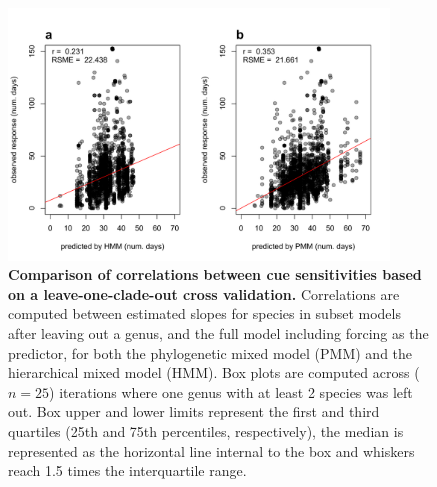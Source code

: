 \documentclass{article}
\begin{document}
\begin{figure}
  \centering
\noindent \includegraphics[width=0.9\textwidth]{../../analyses/phylogeny/figures/FigSXXX_LOCO_observed_vs_predicted}
  \caption{\textbf{Comparison of correlations between cue sensitivities based on a leave-one-clade-out cross validation.} Correlations are computed between estimated slopes for species in subset models after leaving out a genus, and the full model including forcing as the predictor, for both the phylogenetic mixed model (PMM) and the hierarchical mixed model (HMM). Box plots are computed across ($n = 25$) iterations where one genus with at least 2 species was left out. Box upper and lower limits represent the first and third quartiles (25th and 75th percentiles, respectively), the median is represented as the horizontal line internal to the box and whiskers reach 1.5 times the interquartile range.}
  \label{fig:LOCO_obsvspred} 
\end{figure}
\clearpage
\end{document}
